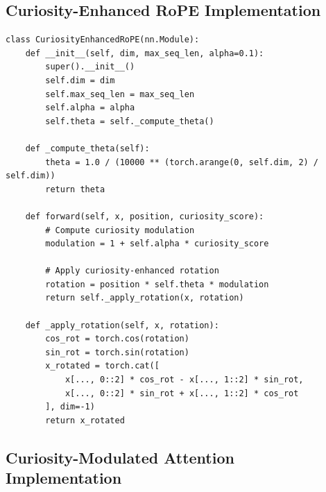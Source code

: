 \documentclass{IEEEtran}
\begin{document}
\subsection{Curiosity-Enhanced RoPE Implementation}

\begin{verbatim}
class CuriosityEnhancedRoPE(nn.Module):
    def __init__(self, dim, max_seq_len, alpha=0.1):
        super().__init__()
        self.dim = dim
        self.max_seq_len = max_seq_len
        self.alpha = alpha
        self.theta = self._compute_theta()
    
    def _compute_theta(self):
        theta = 1.0 / (10000 ** (torch.arange(0, self.dim, 2) / self.dim))
        return theta
    
    def forward(self, x, position, curiosity_score):
        # Compute curiosity modulation
        modulation = 1 + self.alpha * curiosity_score
        
        # Apply curiosity-enhanced rotation
        rotation = position * self.theta * modulation
        return self._apply_rotation(x, rotation)
    
    def _apply_rotation(self, x, rotation):
        cos_rot = torch.cos(rotation)
        sin_rot = torch.sin(rotation)
        x_rotated = torch.cat([
            x[..., 0::2] * cos_rot - x[..., 1::2] * sin_rot,
            x[..., 0::2] * sin_rot + x[..., 1::2] * cos_rot
        ], dim=-1)
        return x_rotated
\end{verbatim}

\subsection{Curiosity-Modulated Attention Implementation}
\end{document}
